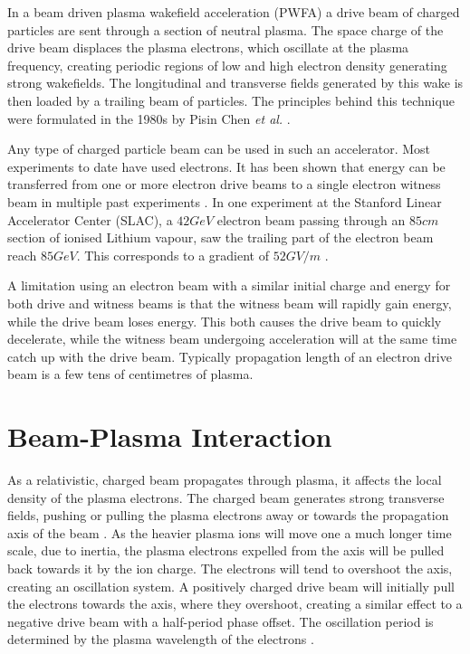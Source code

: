In a beam driven plasma wakefield acceleration (PWFA) a drive beam of charged particles are sent through a section of neutral plasma. The space charge of the drive beam displaces the plasma electrons, which oscillate at the plasma frequency, creating periodic regions of low and high electron density generating strong wakefields. The longitudinal and transverse fields generated by this wake is then loaded by a trailing beam of particles. The principles behind this technique were formulated in the 1980s by Pisin Chen \emph{et al.} \cite{chen:1985}.

Any type of charged particle beam can be used in such an accelerator. Most experiments to date have used electrons. It has been shown that energy can be transferred from one or more electron drive beams to a single electron witness beam in multiple past experiments \cite{rosenzweig:1988, blumenfeld:2007, kallos:2008, litos:2014}. In one experiment at the Stanford Linear Accelerator Center (SLAC), a $42\unit{GeV}$ electron beam passing through an $85\unit{cm}$ section of ionised Lithium vapour, saw the trailing part of the electron beam reach $85\unit{GeV}$. This corresponds to a gradient of $52\unit{GV/m}$ \cite{blumenfeld:2007}.

A limitation using an electron beam with a similar initial charge and energy for both drive and witness beams is that the witness beam will rapidly gain energy, while the drive beam loses energy. This both causes the drive beam to quickly decelerate, while the witness beam undergoing acceleration will at the same time catch up with the drive beam. Typically propagation length of an electron drive beam is a few tens of centimetres of plasma.

\section{Beam-Plasma Interaction}
\label{Int:BPI}

As a relativistic, charged beam propagates through plasma, it affects the local density of the plasma electrons. The charged beam generates strong transverse fields, pushing or pulling the plasma electrons away or towards the propagation axis of the beam \cite{lee:2001,adli:2016b}. As the heavier plasma ions will move one a much longer time scale, due to inertia, the plasma electrons expelled from the axis will be pulled back towards it by the ion charge. The electrons will tend to overshoot the axis, creating an oscillation system. A positively charged drive beam will initially pull the electrons towards the axis, where they overshoot, creating a similar effect to a negative drive beam with a half-period phase offset. The oscillation period is determined by the plasma wavelength of the electrons \cite{hogan:2016,muggli:2017}. 

